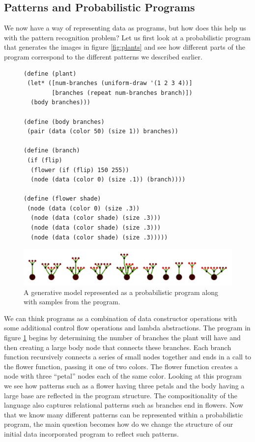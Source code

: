 \documentclass[a4paper,10pt]{article}
\begin{document}
\subsection{Patterns and Probabilistic Programs}
We now have a way of representing data as programs, but how does this help us with the pattern recognition problem?  Let us first look at a probabilistic program that generates the images in figure \ref{fig:plants} and see how different parts of the program correspond to the different patterns we described earlier.  
\begin{figure}[h]
\begin{center}
\begin{verbatim}
(define (plant)
 (let* ([num-branches (uniform-draw '(1 2 3 4))]
        [branches (repeat num-branches branch)])
  (body branches)))

(define (body branches) 
 (pair (data (color 50) (size 1)) branches))

(define (branch)
 (if (flip)
  (flower (if (flip) 150 255))
  (node (data (color 0) (size .1)) (branch))))

(define (flower shade)
 (node (data (color 0) (size .3))
  (node (data (color shade) (size .3)))
  (node (data (color shade) (size .3)))
  (node (data (color shade) (size .3)))))
\end{verbatim}
\includegraphics[scale=.25]{plants.pdf}
\end{center}
\label{prog:genModel}
\caption{A generative model represented as a probabilistic program along with samples from the program.}
\end{figure}
We can think programs as a combination of data constructor operations with some additional control flow operations and lambda abstractions.  The program in figure \ref{prog:genModel} begins by determining the number of branches the plant will have and then creating a large body node that connects these branches.  Each branch function recursively connects a series of small nodes together and ends in a call to the flower function, passing it one of two colors.  The flower function creates a node with three ``petal'' nodes each of the same color.  Looking at this program we see how patterns such as a flower having three petals and the body having a large base are reflected in the program structure.  The compositionality of the language also captures relational patterns such as branches end in flowers.  Now that we know many different patterns can be represented within a probabilistic program, the main question becomes how do we change the structure of our initial data incorporated program to reflect such patterns.
\end{document}
